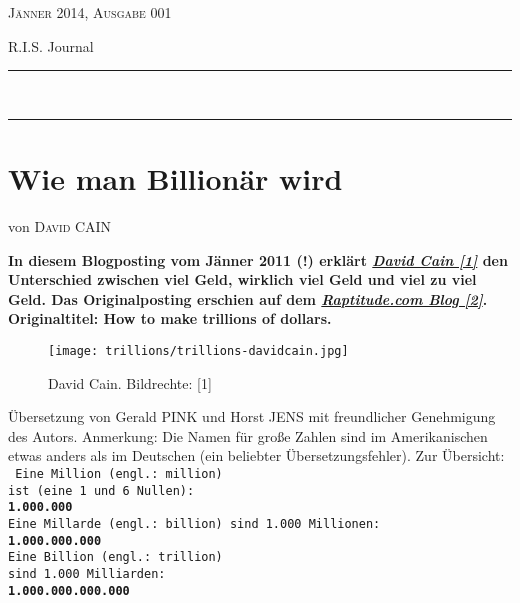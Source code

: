\documentclass[10pt,a4paper,ngerman,twoside]{article} %
\newcommand{\HorRule}[1]{\noindent\rule{\linewidth}{#1}} %
\newcommand{\NewsletterName}[1]{ %
\begin{center}
\Huge \usefont{T1}{fvs}{b}{n} %
#1
\end{center}	
\par \normalsize \normalfont}
\newcommand{\JournalIssue}[1]{ %
\hfill \textsc{Jänner 2014, Ausgabe 001}
\par \normalsize \normalfont}
\newcommand{\NewsItem}[1]{ %
\usefont{T1}{fvs}{n}{n} %
\vspace{24pt}\large #1\vspace{3pt} %
\par \normalsize \normalfont}
\newcommand{\NewsAuthor}[1]{ %
\hfill von \textsc{#1} \vspace{20pt} %
\par \normalfont}
\begin{document}
\JournalIssue{1} %
\NewsletterName{R.I.S. Journal} %
\noindent\HorRule{3pt} \\[-0.75\baselineskip] %
\HorRule{1pt} %




%

\NewsItem{}
\section*{Wie man Billion\"ar wird}
\label{trillions}
\NewsAuthor{David CAIN}

\textbf{In diesem Blogposting vom Jänner 2011 (!) erklärt \href{http://www.raptitude.com/contact/}{\textit{David Cain [1]}} den Unterschied zwischen viel Geld, wirklich viel Geld und viel zu viel Geld. Das Originalposting erschien auf dem \href{http://www.raptitude.com/2011/01/how-to-make-trillions-of-dollars}{\textit{Raptitude.com Blog [2]}}. Originaltitel: How to make trillions of dollars.}

\begin{figure}
\texttt{[image: trillions/trillions-davidcain.jpg]} 
\caption{David Cain. Bildrechte: [1]}
\end{figure}

Übersetzung von Gerald PINK und Horst JENS mit freundlicher Genehmigung des Autors. Anmerkung: Die Namen für große Zahlen sind im Amerikanischen etwas anders als im Deutschen (ein beliebter Übersetzungsfehler). Zur Übersicht: \\
\texttt{
Eine Million  (engl.: million)\\
ist (eine 1 und 6 Nullen):\\
\textbf{1.000.000}\\
Eine Millarde (engl.: billion)
sind 1.000 Millionen:\\
\textbf{1.000.000.000}\\
Eine Billion  (engl.: trillion) \\
sind 1.000 Milliarden: \\
\textbf{1.000.000.000.000}
}
\end{document}

